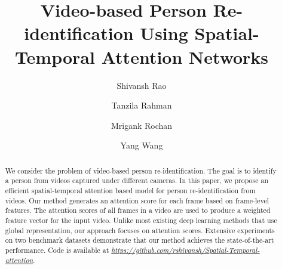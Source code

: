 \documentclass[sigconf, authordraft,review=false]{acmart}
\begin{document}
\title{Video-based Person Re-identification Using Spatial-Temporal Attention Networks}



\author{Shivansh Rao}

\author{Tanzila Rahman}

\author{Mrigank Rochan}

\author{Yang Wang}


\begin{abstract}
We consider the problem of video-based person re-identification. The goal is to identify a person from videos captured under different cameras. In this paper, we propose an efficient spatial-temporal attention based model for person re-identification from  videos. Our  method  generates  an  attention  score for each frame based on frame-level features. The attention scores of all frames in a video are used to produce a weighted feature vector for the input video. Unlike most existing deep learning methods that use global representation, our approach focuses on attention scores. Extensive experiments on two benchmark datasets demonstrate that our method achieves the state-of-the-art performance. Code is available at \textit{\textcolor{red}{\url{https://github.com/rshivansh/Spatial-Temporal-attention}}}.
\end{abstract}
\end{document}
